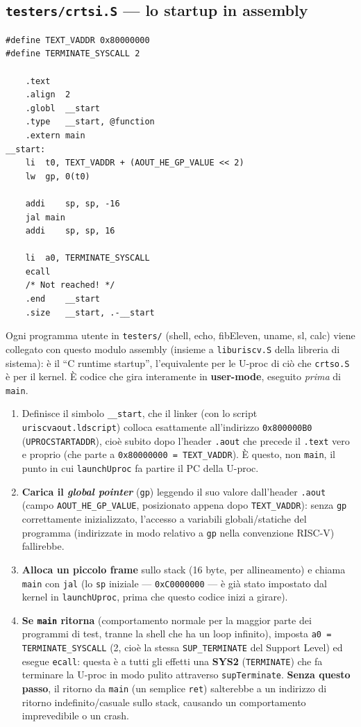 \documentclass[11pt,a4paper]{article}
\newcommand{\code}[1]{\texttt{#1}}
\begin{document}
\subsection{\code{testers/crtsi.S} --- lo startup in assembly}
\begin{lstlisting}
#define TEXT_VADDR 0x80000000
#define TERMINATE_SYSCALL 2

    .text
    .align  2
    .globl  __start
    .type   __start, @function
    .extern main
__start:
    li  t0, TEXT_VADDR + (AOUT_HE_GP_VALUE << 2)
    lw  gp, 0(t0)

    addi    sp, sp, -16
    jal main
    addi    sp, sp, 16

    li  a0, TERMINATE_SYSCALL
    ecall
    /* Not reached! */
    .end    __start
    .size   __start, .-__start
\end{lstlisting}
Ogni programma utente in \code{testers/} (shell, echo, fibEleven, uname, sl,
calc) viene collegato con questo modulo assembly (insieme a
\code{liburiscv.S} della libreria di sistema): è il ``C runtime startup'',
l'equivalente per le U-proc di ciò che \code{crtso.S} è per il kernel. È
codice che gira interamente in \textbf{user-mode}, eseguito \emph{prima} di
\code{main}.
\begin{enumerate}
\item Definisce il simbolo \code{\_\_start}, che il linker (con lo script
  \code{uriscvaout.ldscript}) colloca esattamente all'indirizzo
  \code{0x800000B0} (\code{UPROCSTARTADDR}), cioè subito dopo l'header
  \code{.aout} che precede il \code{.text} vero e proprio (che parte a
  \code{0x80000000 = TEXT\_VADDR}). \`E questo, non \code{main}, il punto in
  cui \code{launchUproc} fa partire il PC della U-proc.
\item \textbf{Carica il \emph{global pointer}} (\code{gp}) leggendo il suo
  valore dall'header \code{.aout} (campo \code{AOUT\_HE\_GP\_VALUE},
  posizionato appena dopo \code{TEXT\_VADDR}): senza \code{gp} correttamente
  inizializzato, l'accesso a variabili globali/statiche del programma
  (indirizzate in modo relativo a \code{gp} nella convenzione RISC-V)
  fallirebbe.
\item \textbf{Alloca un piccolo frame} sullo stack (16 byte, per
  allineamento) e chiama \code{main} con \code{jal} (lo \code{sp} iniziale
  --- \code{0xC0000000} --- è già stato impostato dal kernel in
  \code{launchUproc}, prima che questo codice inizi a girare).
\item \textbf{Se \code{main} ritorna} (comportamento normale per la maggior
  parte dei programmi di test, tranne la shell che ha un loop infinito),
  imposta \code{a0 = TERMINATE\_SYSCALL} (2, cioè la stessa
  \code{SUP\_TERMINATE} del Support Level) ed esegue \code{ecall}: questa è
  a tutti gli effetti una \textbf{SYS2} (\code{TERMINATE}) che fa terminare
  la U-proc in modo pulito attraverso \code{supTerminate}. \textbf{Senza
  questo passo}, il ritorno da \code{main} (un semplice \code{ret})
  salterebbe a un indirizzo di ritorno indefinito/casuale sullo stack,
  causando un comportamento imprevedibile o un crash.
\end{enumerate}
\end{document}

